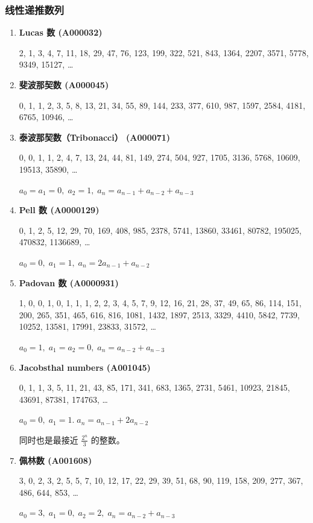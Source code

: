 \documentclass[a4paper, twoside]{article}
\begin{document}
        \subsubsection{线性递推数列}

        \begin{enumerate}
        
        \item \textbf{Lucas 数 (A000032)}
        
        2, 1, 3, 4, 7, 11, 18, 29, 47, 76, 123, 199, 322, 521, 843, 1364, 2207, 3571, 5778, 9349, 15127, \dots
        
        \item \textbf{斐波那契数 (A000045)}
        
        0, 1, 1, 2, 3, 5, 8, 13, 21, 34, 55, 89, 144, 233, 377, 610, 987, 1597, 2584, 4181, 6765, 10946, \dots
        
        \item \textbf{泰波那契数（Tribonacci） (A000071)}
        
        0, 0, 1, 1, 2, 4, 7, 13, 24, 44, 81, 149, 274, 504, 927, 1705, 3136, 5768, 10609, 19513, 35890, \dots
        
        $ a_0 = a_1 = 0,\; a_2 = 1,\; a_n = a_{n - 1} + a_{n - 2} + a_{n - 3} $
        
        \item \textbf{Pell 数 (A0000129)}
        
        0, 1, 2, 5, 12, 29, 70, 169, 408, 985, 2378, 5741, 13860, 33461, 80782, 195025, 470832, 1136689, \dots
        
        $ a_0 = 0,\; a_1 = 1,\; a_n = 2a_{n - 1} + a_{n - 2} $
        
        \item \textbf{Padovan 数 (A0000931)}
        
        1, 0, 0, 1, 0, 1, 1, 1, 2, 2, 3, 4, 5, 7, 9, 12, 16, 21, 28, 37, 49, 65, 86, 114, 151, 200, 265, 351, 465, 616, 816, 1081, 1432, 1897, 2513, 3329, 4410, 5842, 7739, 10252, 13581,  17991,   23833, 31572, \dots
        
        $a_0 = 1,\; a_1 = a_2 = 0,\; a_n = a_{n - 2} + a_{n - 3}$
        
        \item \textbf{Jacobsthal numbers (A001045)}
        
        0, 1, 1, 3, 5, 11, 21, 43, 85, 171, 341, 683, 1365, 2731, 5461, 10923, 21845, 43691, 87381, 174763, \dots
        
        $ a_0 = 0,\; a_1 = 1.\; a_n = a_{n - 1} + 2a_{n - 2} $
        
        同时也是最接近 $\frac {2 ^ n} 3$ 的整数。
        
        \item \textbf{佩林数 (A001608)}
        
        3, 0, 2, 3, 2, 5, 5, 7, 10, 12, 17, 22, 29, 39, 51, 68, 90, 119, 158, 209, 277, 367, 486, 644, 853, \dots
        
        $ a_0 = 3,\; a_1 = 0,\; a_2 = 2,\; a_n = a_{n - 2} + a_{n - 3} $
        
        \end{enumerate}
\end{document}
